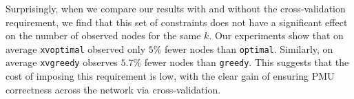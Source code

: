 {%

Surprisingly, when we compare our results with and without the cross-validation requirement, we find that this set of constraints does not have a significant effect on the number of observed nodes for the same $k$. Our experiments show that on average {\tt xvoptimal} observed only $5\%$ fewer nodes than {\tt optimal}.  Similarly, on average {\tt xvgreedy} observes
 $5.7\%$ fewer nodes than {\tt greedy}. This suggests that the cost of imposing this requirement is low, with the clear gain of ensuring PMU correctness across the network via cross-validation. 



}
